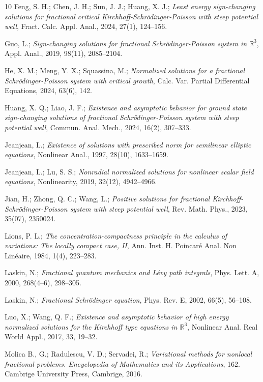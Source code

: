 \documentclass[11pt]{article}
\numberwithin{equation}{section}
\begin{document}
\begin{thebibliography}{10}
  Feng, S. H.;  Chen, J. H.; Sun, J. J.; Huang, X. J.;
\emph{Least energy sign-changing solutions for fractional critical 
Kirchhoff-Schr\"odinger-Poisson with steep potential well},
 Fract. Calc. Appl. Anal., 2024, 27(1), 124--156.

  Guo, L.;
\emph{Sign-changing solutions for fractional Schr\"odinger-Poisson system in
 $\mathbb{R}^3$}, Appl. Anal., 2019, 98(11), 2085--2104.

 He, X. M.; Meng, Y. X.; Squassina, M.;
\emph{Normalized solutions for a fractional Schr\"odinger-Poisson system with 
critical growth}, Calc. Var. Partial Differential Equations, 2024,  63(6), 142.

 Huang, X. Q.; Liao, J. F.;
\emph{Existence and asymptotic behavior for ground state sign-changing solutions 
of fractional Schr\"odinger-Poisson system with steep potential well},
Commun. Anal. Mech., 2024, 16(2), 307--333.

  Jeanjean, L.;
\emph{Existence of solutions with prescribed norm for semilinear elliptic equations},
Nonlinear Anal., 1997,  28(10), 1633--1659.

 Jeanjean, L.; Lu, S. S.;
\emph{Nonradial normalized solutions for nonlinear scalar field equations},
Nonlinearity, 2019, 32(12), 4942--4966.

  Jian, H.; Zhong, Q. C.; Wang, L.;
\emph{Positive solutions for fractional Kirchhoff-Schr\"odinger-Poisson system with 
steep potential well},  Rev. Math. Phys.,  2023, 35(07), 2350024.

 Lions, P. L.;
\emph{The concentration-compactness principle in the calculus of variations:
The locally compact case, II},
Ann. Inst. H. Poincar\'e Anal. Non Lin\'eaire, 1984,  1(4), 223--283.

   Laskin, N.;
\emph{Fractional quantum mechanics and L\'evy path integrals},
Phys. Lett. A, 2000,  268(4--6), 298--305.

  Laskin, N.;
\emph{Fractional Schr\"odinger equation}, Phys. Rev. E, 2002, 66(5), 56--108.

  Luo, X.;  Wang, Q. F.;
\emph{Existence and asymptotic behavior of high energy normalized solutions for 
the Kirchhoff type equations in $\mathbb{R}^3$},
 Nonlinear Anal. Real World Appl., 2017, 33, 19--32.

  Molica B., G.; Radulescu, V. D.; Servadei, R.;
\emph{Variational methods for nonlocal fractional problems. Encyclopedia of 
Mathematics and its Applications}, 162. Cambrige University Press, Cambrige, 2016.


\end{thebibliography}
\end{document}
